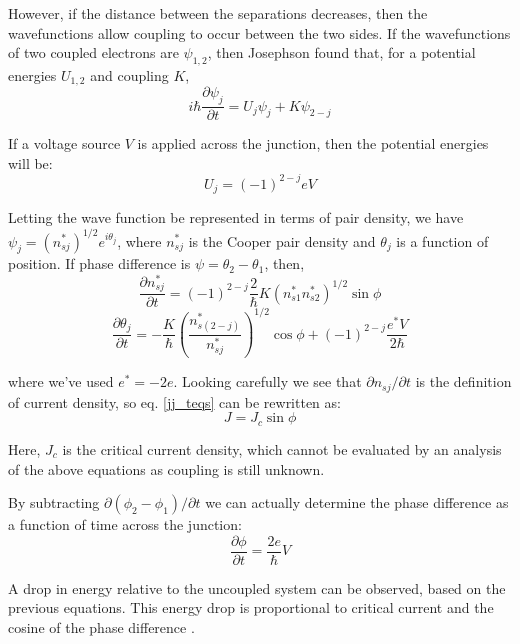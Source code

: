 \documentclass[letterpaper,english,reprint, aps]{revtex4-1}
\begin{document}
However, if the distance between the separations decreases, then the wavefunctions allow coupling to occur between the two sides. If the wavefunctions of two coupled electrons are $\psi_{1,2}$, then Josephson found that, for a potential energies $U_{1,2}$ and coupling $K$,
\begin{equation}
    i\hbar \frac{\partial \psi_j}{\partial t} = U_j\psi_j + K\psi_{2-j}
\end{equation}

If a voltage source $V$ is applied across the junction, then the potential energies will be:
\begin{equation}
    U_j = (-1)^{2-j}eV
\end{equation}

Letting the wave function be represented in terms of pair density, we have $\psi_j = (n_{sj}^*)^{1/2}e^{i\theta_j}$, where $n_{sj}^*$ is the Cooper pair density and $\theta_j$ is a function of position. If phase difference is $\psi = \theta_2 - \theta_1$, then,
\begin{equation}
    \label{jj_teqs}
    \frac{\partial n_{sj}^*}{\partial t} = (-1)^{2-j}\frac{2}{\hbar}K(n_{s1}^*n_{s2}^*)^{1/2}\sin\phi
\end{equation}
\begin{equation}
    \frac{\partial \theta_j}{\partial t} = -\frac{K}{\hbar}\left(\frac{n_{s(2-j)}^*}{n_{sj}^*}\right)^{1/2}\cos\phi + (-1)^{2-j}\frac{e^*V}{2\hbar}
\end{equation}

where we've used $e^* = -2e$. Looking carefully we see that $\partial n_{sj}/\partial t$ is the definition of current density, so eq. \ref{jj_teqs} can be rewritten as:
\begin{equation}
    J = J_c\sin\phi
\end{equation}

Here, $J_c$ is the critical current density, which cannot be evaluated by an analysis of the above equations as coupling is still unknown.

By subtracting $\partial(\phi_2-\phi_1)/\partial t$ we can actually determine the phase difference as a function of time across the junction:
\begin{equation}
    \frac{\partial\phi}{\partial t} = \frac{2e}{\hbar}V
\end{equation}

A drop in energy relative to the uncoupled system can be observed, based on the previous equations. This energy drop is proportional to critical current and the cosine of the phase difference \citep{josephson,josephson_ieee,vanduzer}.
\end{document}
